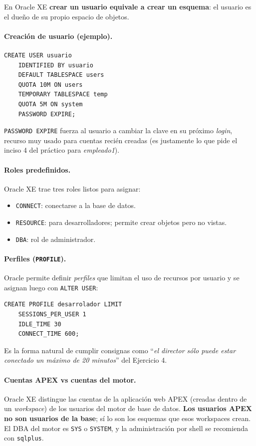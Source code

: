 \documentclass[11pt,a4paper]{article}
\begin{document}
En Oracle XE \textbf{crear un usuario equivale a crear un esquema}: el
usuario es el dueño de su propio espacio de objetos.

\paragraph{Creación de usuario (ejemplo).}

\begin{lstlisting}
CREATE USER usuario
    IDENTIFIED BY usuario
    DEFAULT TABLESPACE users
    QUOTA 10M ON users
    TEMPORARY TABLESPACE temp
    QUOTA 5M ON system
    PASSWORD EXPIRE;
\end{lstlisting}

\texttt{PASSWORD EXPIRE} fuerza al usuario a cambiar la clave en su
próximo \emph{login}, recurso muy usado para cuentas recién creadas
(es justamente lo que pide el inciso 4 del práctico para
\emph{empleado1}).

\paragraph{Roles predefinidos.} Oracle XE trae tres roles listos para
asignar:

\begin{itemize}
    \item \texttt{CONNECT}: conectarse a la base de datos.
    \item \texttt{RESOURCE}: para desarrolladores; permite crear
    objetos pero no vistas.
    \item \texttt{DBA}: rol de administrador.
\end{itemize}

\paragraph{Perfiles (\texttt{PROFILE}).} Oracle permite definir
\emph{perfiles} que limitan el uso de recursos por usuario y se
asignan luego con \texttt{ALTER USER}:

\begin{lstlisting}
CREATE PROFILE desarrolador LIMIT
    SESSIONS_PER_USER 1
    IDLE_TIME 30
    CONNECT_TIME 600;
\end{lstlisting}

Es la forma natural de cumplir consignas como ``\emph{el director sólo
puede estar conectado un máximo de 20 minutos}'' del Ejercicio 4.

\paragraph{Cuentas APEX vs cuentas del motor.} Oracle XE distingue las
cuentas de la aplicación web APEX (creadas dentro de un \emph{workspace})
de los usuarios del motor de base de datos. \textbf{Los usuarios APEX
no son usuarios de la base}; sí lo son los esquemas que esos workspaces
crean. El DBA del motor es \texttt{SYS} o \texttt{SYSTEM}, y la
administración por shell se recomienda con \texttt{sqlplus}.
\end{document}
